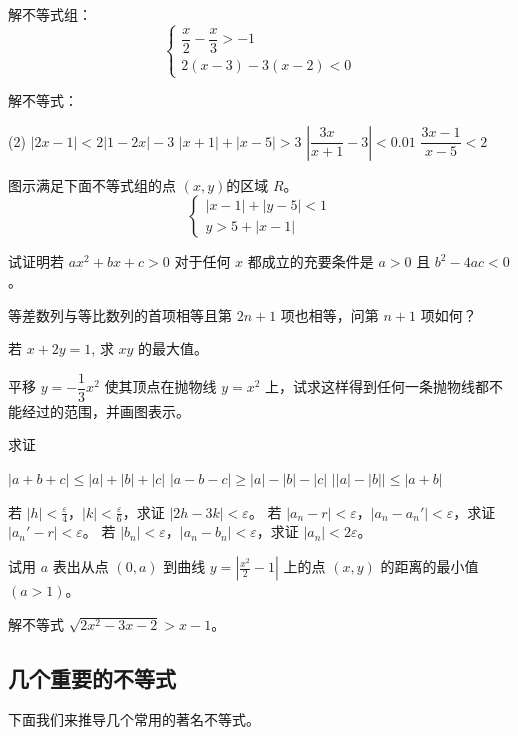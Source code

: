 \begin{Exercise}
\begin{question}
  \item 解不等式组：
    \[\begin{cases}
      \dfrac{x}{2}-\dfrac{x}{3}>-1\\
      2(x-3)-3(x-2)<0
    \end{cases}\]
  \item 解不等式：
  \begin{tasks}(2)
      \task $|2x-1|<2|1-2x|-3$
      \task $|x+1|+|x-5|>3$
      \task $\left|\dfrac{3x}{x+1}-3\right|<0.01$
      \task $\dfrac{3x-1}{x-5}<2$
  \end{tasks}
  \item 图示满足下面不等式组的点 $(x,y)$的区域 $R$。
  \[\begin{cases}
      |x-1|+|y-5|<1\\
  y>5+|x-1|
  \end{cases}\]
  \item 试证明若 $ax^2+bx+c>0$ 对于任何 $x$ 都成立的充要条件是 $a>0$ 且 $b^2-4ac<0$。
  \item 等差数列与等比数列的首项相等且第 $2n+1$ 项也相等，问第 $n+1$ 项如何？
  \item 若 $x+2y=1$, 求 $xy$ 的最大值。
  \item 平移 $y=-\dfrac{1}{3}x^2$ 使其顶点在抛物线 $y=x^2$ 上，试求这样得到任何一条抛物线都不能经过的范围，并画图表示。
  \item 求证
  \begin{tasks}
    \task $|a+b+c|\leqslant |a|+|b|+|c|$
    \task $|a-b-c|\geqslant |a|-|b|-|c|$
    \task $\Big| |a|-|b| \Big|\leqslant |a+b|$
  \end{tasks}
  \item \begin{tasks}
    \task 若 $|h|<\frac{\varepsilon}{4}$，$|k|<\frac{\varepsilon}{6}$，求证 $|2h-3k|<\varepsilon$。
    \task 若 $|a_n-r|<\varepsilon$，$|a_n-a_n'|<\varepsilon$，求证 $|a_n'-r|<\varepsilon$。
    \task 若 $|b_n|<\varepsilon$，$|a_n-b_n|<\varepsilon$，求证 $|a_n|<2\varepsilon$。
  \end{tasks}
  \item 试用 $a$ 表出从点 $(0,a)$ 到曲线 $y=\left|\frac{x^2}{2}-1\right|$ 上的点 $(x,y)$ 的距离的最小值 $(a>1)$。
  \item 解不等式 $\sqrt{2x^2-3x-2}>x-1$。
\end{question}
\end{Exercise}

\subsection{几个重要的不等式}
下面我们来推导几个常用的著名不等式。

